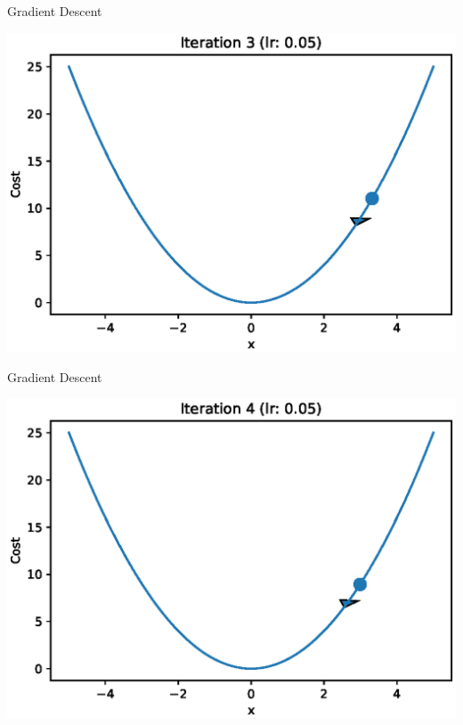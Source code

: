 \documentclass{beamer}
\begin{document}
	\begin{frame}{Gradient Descent}
		\begin{center}
			\includegraphics[totalheight=6cm]{gradient-descent/iteration-3.eps}
		\end{center}
	\end{frame}
	
	\begin{frame}{Gradient Descent}
		\begin{center}
			\includegraphics[totalheight=6cm]{gradient-descent/iteration-4.eps}
		\end{center}
	\end{frame}
	
\end{document}
